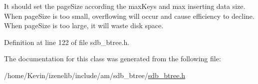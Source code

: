 It should set the pageSize according the maxKeys and max inserting data size. When pageSize is too small, overflowing will occur and cause efficiency to decline. When pageSize is too large, it will waste disk space. 

Definition at line 122 of file sdb\_\-btree.h.

The documentation for this class was generated from the following file:\begin{CompactItemize}
\item 
/home/Kevin/izenelib/include/am/sdb\_\-btree/\hyperlink{sdb__btree_8h}{sdb\_\-btree.h}\end{CompactItemize}
